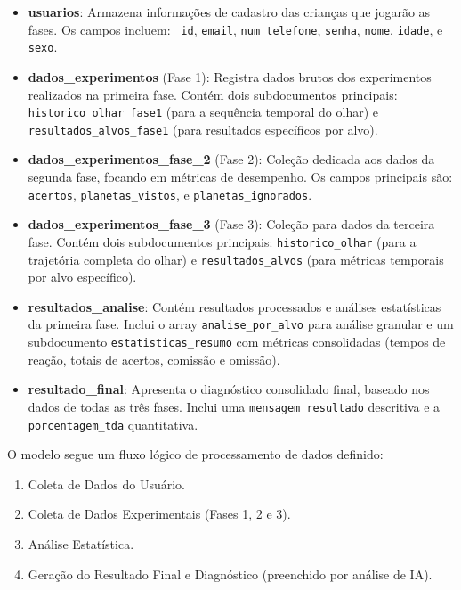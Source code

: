 \documentclass[
  a4paper,%
  12pt,%
  english,%
  brazilian,%
]{article}
\begin{document}
    


\begin{itemize}
    \item \textbf{usuarios}: Armazena informações de cadastro das crianças que jogarão as fases. Os campos incluem: \texttt{\_id}, \texttt{email}, \texttt{num\_telefone}, \texttt{senha}, \texttt{nome}, \texttt{idade}, e \texttt{sexo}.

    \item \textbf{dados\_experimentos} (Fase 1): Registra dados brutos dos experimentos realizados na primeira fase. Contém dois subdocumentos principais: \texttt{historico\_olhar\_fase1} (para a sequência temporal do olhar) e \texttt{resultados\_alvos\_fase1} (para resultados específicos por alvo).

    \item \textbf{dados\_experimentos\_fase\_2} (Fase 2): Coleção dedicada aos dados da segunda fase, focando em métricas de desempenho. Os campos principais são: \texttt{acertos}, \texttt{planetas\_vistos}, e \texttt{planetas\_ignorados}.

    \item \textbf{dados\_experimentos\_fase\_3} (Fase 3): Coleção para dados da terceira fase. Contém dois subdocumentos principais: \texttt{historico\_olhar} (para a trajetória completa do olhar) e \texttt{resultados\_alvos} (para métricas temporais por alvo específico).

    \item \textbf{resultados\_analise}: Contém resultados processados e análises estatísticas da primeira fase. Inclui o array \texttt{analise\_por\_alvo} para análise granular e um subdocumento \texttt{estatisticas\_resumo} com métricas consolidadas (tempos de reação, totais de acertos, comissão e omissão).

    \item \textbf{resultado\_final}: Apresenta o diagnóstico consolidado final, baseado nos dados de todas as três fases. Inclui uma \texttt{mensagem\_resultado} descritiva e a \texttt{porcentagem\_tda} quantitativa.
\end{itemize}


O modelo segue um fluxo lógico de processamento de dados definido:
\begin{enumerate}
    \item Coleta de Dados do Usuário.
    \item Coleta de Dados Experimentais (Fases 1, 2 e 3).
    \item Análise Estatística.
    \item Geração do Resultado Final e Diagnóstico (preenchido por análise de IA).
\end{enumerate}
\end{document}
